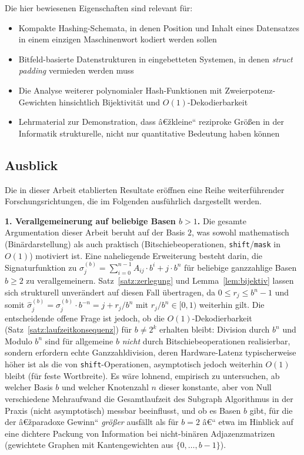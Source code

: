 ﻿\documentclass[a4paper,12pt]{article}
\theoremstyle{definition}
\begin{document}
Die hier bewiesenen Eigenschaften sind relevant für:
\begin{itemize}
	\item Kompakte Hashing-Schemata, in denen Position und Inhalt eines
	      Datensatzes in einem einzigen Maschinenwort kodiert werden sollen
	\item Bitfeld-basierte Datenstrukturen in eingebetteten Systemen, in
	      denen \emph{struct padding} vermieden werden muss
	\item Die Analyse weiterer polynomialer Hash-Funktionen mit
	      Zweierpotenz-Gewichten hinsichtlich Bijektivität und
	      $O(1)$-Dekodierbarkeit
	\item Lehrmaterial zur Demonstration, dass â€žkleine`` reziproke Größen
	      in der Informatik strukturelle, nicht nur quantitative Bedeutung
	      haben können
\end{itemize}

\subsection{Ausblick}

Die in dieser Arbeit etablierten Resultate eröffnen eine Reihe
weiterführender Forschungsrichtungen, die im Folgenden ausführlich
dargestellt werden.

\textbf{1. Verallgemeinerung auf beliebige Basen $b > 1$.}
Die gesamte Argumentation dieser Arbeit beruht auf der Basis $2$, was sowohl
mathematisch (Binärdarstellung) als auch praktisch (Bitschiebeoperationen,
\texttt{shift}/\texttt{mask} in $O(1)$) motiviert ist. Eine naheliegende
Erweiterung besteht darin, die Signaturfunktion zu
$\sigma_j^{(b)} = \sum_{i=0}^{n-1}A_{ij}\cdot b^i + j\cdot b^n$ für beliebige
ganzzahlige Basen $b \geq 2$ zu verallgemeinern. Satz~\ref{satz:zerlegung}
und Lemma~\ref{lem:bijektiv} lassen sich strukturell unverändert auf diesen
Fall übertragen, da $0 \leq r_j \leq b^n - 1$ und somit
$\hat\sigma_j^{(b)} = \sigma_j^{(b)}\cdot b^{-n} = j + r_j/b^n$ mit
$r_j/b^n\in[0,1)$ weiterhin gilt. Die entscheidende offene Frage ist jedoch,
ob die $O(1)$-Dekodierbarkeit (Satz~\ref{satz:laufzeitkonsequenz}) für $b\neq2^k$
erhalten bleibt: Division durch $b^n$ und Modulo $b^n$ sind für allgemeine
$b$ \emph{nicht} durch Bitschiebeoperationen realisierbar, sondern erfordern
echte Ganzzahldivision, deren Hardware-Latenz typischerweise höher ist als
die von \texttt{shift}-Operationen, asymptotisch jedoch weiterhin $O(1)$
bleibt (für feste Wortbreite). Es wäre lohnend, empirisch zu untersuchen, ab
welcher Basis $b$ und welcher Knotenzahl $n$ dieser konstante, aber von Null
verschiedene Mehraufwand die Gesamtlaufzeit des Subgraph Algorithmus in der
Praxis (nicht asymptotisch) messbar beeinflusst, und ob es Basen $b$ gibt,
für die der â€žparadoxe Gewinn`` \emph{größer} ausfällt als für $b=2$ â€“ etwa im
Hinblick auf eine dichtere Packung von Information bei nicht-binären
Adjazenzmatrizen (gewichtete Graphen mit Kantengewichten aus
$\{0,\ldots,b-1\}$).
\end{document}
